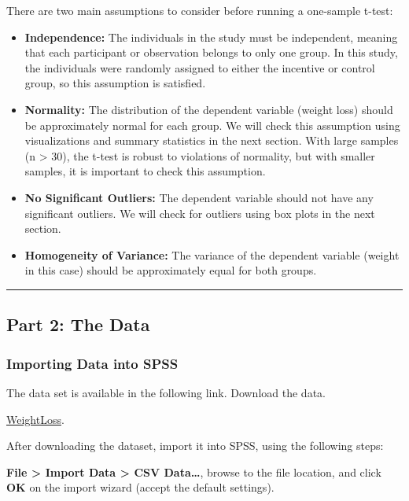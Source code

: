 \documentclass[
  letterpaper,
  DIV=11,
  numbers=noendperiod]{scrartcl}
\begin{document}
There are two main assumptions to consider before running a one-sample
t-test:

\begin{itemize}
\item
  \textbf{Independence:} The individuals in the study must be
  independent, meaning that each participant or observation belongs to
  only one group. In this study, the individuals were randomly assigned
  to either the incentive or control group, so this assumption is
  satisfied.
\item
  \textbf{Normality:} The distribution of the dependent variable (weight
  loss) should be approximately normal for each group. We will check
  this assumption using visualizations and summary statistics in the
  next section. With large samples (n \textgreater{} 30), the t-test is
  robust to violations of normality, but with smaller samples, it is
  important to check this assumption.
\item
  \textbf{No Significant Outliers:} The dependent variable should not
  have any significant outliers. We will check for outliers using box
  plots in the next section.
\item
  \textbf{Homogeneity of Variance:} The variance of the dependent
  variable (weight in this case) should be approximately equal for both
  groups.
\end{itemize}

\begin{center}\rule{0.5\linewidth}{0.5pt}\end{center}

\subsection{Part 2: The Data}\label{part-2-the-data}

\subsubsection{Importing Data into SPSS}\label{importing-data-into-spss}

The data set is available in the following link. Download the data.

\href{datasets/weightLoss.csv}{WeightLoss}.

After downloading the dataset, import it into SPSS, using the following
steps:

\textbf{File \textgreater{} Import Data \textgreater{} CSV
Data\ldots{}}, browse to the file location, and click \textbf{OK} on the
import wizard (accept the default settings).
\end{document}
